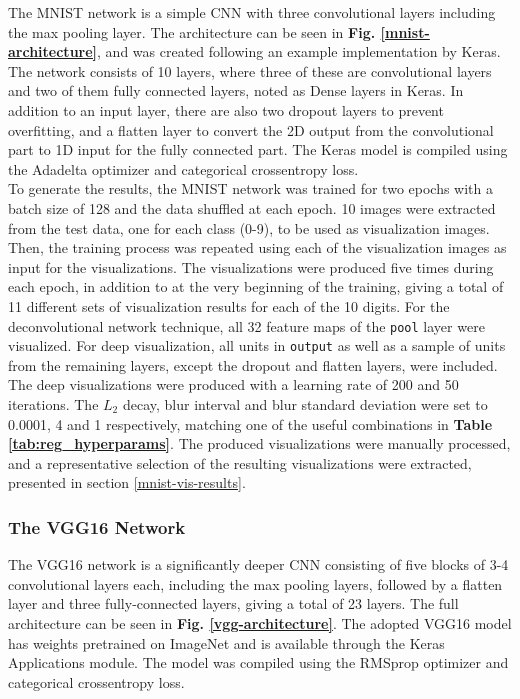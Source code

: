 

The MNIST network is a simple CNN with three convolutional layers including the max pooling layer. The architecture can be seen in \textbf{Fig. \ref{mnist-architecture}}, and was created following an example implementation by Keras. The network consists of 10 layers, where three of these are convolutional layers and two of them fully connected layers, noted as Dense layers in Keras. In addition to an input layer, there are also two dropout layers to prevent overfitting, and a flatten layer to convert the 2D output from the convolutional part to 1D input for the fully connected part. The Keras model is compiled using the Adadelta optimizer and categorical crossentropy loss. \\

\noindent To generate the results, the MNIST network was trained for two epochs with a batch size of 128 and the data shuffled at each epoch. 10 images were extracted from the test data, one for each class (0-9), to be used as visualization images. Then, the training process was repeated using each of the visualization images as input for the visualizations. The visualizations were produced five times during each epoch, in addition to at the very beginning of the training, giving a total of 11 different sets of visualization results for each of the 10 digits. For the deconvolutional network technique, all 32 feature maps of the \texttt{pool} layer were visualized. For deep visualization, all units in \texttt{output} as well as a sample of units from the remaining layers, except the dropout and flatten layers, were included. The deep visualizations were produced with a learning rate of 200 and 50 iterations. The $L_2$ decay, blur interval and blur standard deviation were set to 0.0001, 4 and 1 respectively, matching one of the useful combinations in \textbf{Table \ref{tab:reg_hyperparams}}. The produced visualizations were manually processed, and a representative selection of the resulting visualizations were extracted, presented in section \ref{mnist-vis-results}.

\subsubsection{The VGG16 Network}

The VGG16 network is a significantly deeper CNN consisting of five blocks of 3-4 convolutional layers each, including the max pooling layers, followed by a flatten layer and three fully-connected layers, giving a total of 23 layers. The full architecture can be seen in \textbf{Fig. \ref{vgg-architecture}}. The adopted VGG16 model has weights pretrained on ImageNet and is available through the Keras Applications module. The model was compiled using the RMSprop optimizer and categorical crossentropy loss. \\

